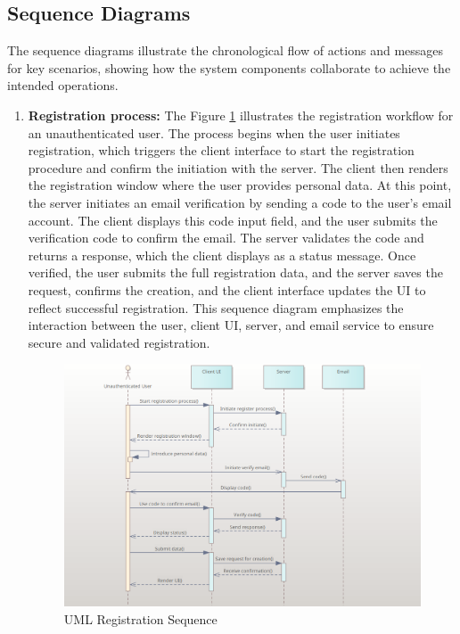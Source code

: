 \subsection{Sequence Diagrams}
The sequence diagrams illustrate the chronological flow of actions and messages for key scenarios, showing how the system components collaborate to achieve the intended operations.\begin{enumerate}
    \item \textbf{Registration process:} The Figure \ref{uml-sequence-registration} illustrates the registration workflow for an unauthenticated user. The process begins when the user initiates registration, which triggers the client interface to start the registration procedure and confirm the initiation with the server. The client then renders the registration window where the user provides personal data. At this point, the server initiates an email verification by sending a code to the user’s email account. The client displays this code input field, and the user submits the verification code to confirm the email. The server validates the code and returns a response, which the client displays as a status message. Once verified, the user submits the full registration data, and the server saves the request, confirms the creation, and the client interface updates the UI to reflect successful registration. This sequence diagram emphasizes the interaction between the user, client UI, server, and email service to ensure secure and validated registration.
    \begin{figure}[H]
        \centering
        \includegraphics[width=18cm]{"images/umlDiagrams/uml-sequence-registration.png"}
        \caption{UML Registration Sequence}
        \label{uml-sequence-registration}
    \end{figure}


\end{enumerate}
